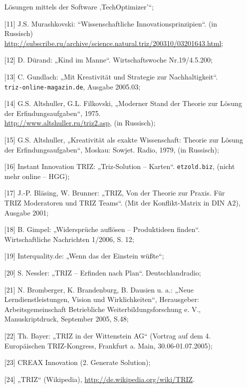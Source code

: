 \documentclass[11pt,a4paper]{article}
\begin{document}
\begin{itemize}
  Lösungen mittels der Software ‚TechOptimizer’“;
\item[{[11]}] J.S. Murashkovski: “Wissenschaftliche Innovationsprinzipien“.
  (in Russisch)\\
  \url{http://subscribe.ru/archive/science.natural.triz/200310/03201643.html};
\item[{[12]}] D. Dürand: „Kind im Manne“. Wirtschaftswoche Nr.19/4.5.200;
\item[{[13]}] C. Gundlach: „Mit Kreativität und Strategie zur
  Nachhaltigkeit“. \\ \texttt{triz-online-magazin.de}, Ausgabe 2005.03;
\item[{[14]}] G.S. Altshuller, G.L. Filkovski, „Moderner Stand der Theorie zur
  Lösung der Erfindungsaufgaben“, 1975.\\
  \url{http://www.altshuller.ru/triz2.asp}, (in Russisch);
\item[{[15]}] G.S. Altshuller, „Kreativität als exakte Wissenschaft: Theorie
  zur Lösung der Erfindungsaufgaben“, Moskau: Sowjet. Radio, 1979, (in
  Russisch);
\item[{[16]}] Instant Innovation TRIZ: „Triz-Solution – Karten“.
  \texttt{etzold.biz}, (nicht mehr online -- HGG);
\item[{[17]}] J.-P. Bläsing, W. Brunner: „TRIZ, Von der Theorie zur Praxis.
  Für TRIZ Moderatoren und TRIZ Teams“. (Mit der Konflikt-Matrix in DIN A2),
  Ausgabe 2001;
\item[{[18]}] B. Gimpel: „Widersprüche auflösen – Produktideen finden“.
  Wirtschaftliche Nachrichten 1/2006, S. 12;
\item[{[19]}] Interquality.de: „Wenn das der Einstein wüßte“;
\item[{[20]}] S. Nessler: „TRIZ -- Erfinden nach Plan“.  Deutschlandradio;
\item[{[21]}] N. Bromberger, K. Brandenburg, B. Dausien u. a.: „Neue
  Lerndienstleistungen, Vision und Wirklichkeiten“, Herausgeber:
  Arbeitsgemeinschaft Betriebliche Weiterbildungsforschung e. V.,
  Manuskriptdruck, September 2005, S.48;
\item[{[22]}] Th. Bayer: „TRIZ in der Wittenstein AG“ (Vortrag auf dem
  4. Europäischen TRIZ-Kongress, Frankfurt a. Main, 30.06-01.07.2005);
\item[{[23]}] CREAX Innovation (2. Generate Solution);
\item[{[24]}] „TRIZ“ (Wikipedia), \url{http://de.wikipedia.org/wiki/TRIZ}.
\end{itemize}

    
\end{document}
